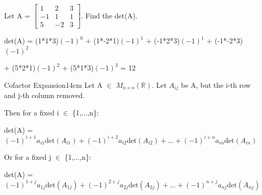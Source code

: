     \vspace{0.5cm}



    \begin{example}
        Let A =
        $
        \begin{bmatrix}
            1 & 2 & 3 \\
            -1 & 1 & 1 \\
            5 & -2 & 3 
        \end{bmatrix}
        $.
        Find the det(A).
    \end{example}

    \begin{tbox}
        det(A) =
        (1*1*3)$(-1)^0$
        + (1*-2*1)$(-1)^1$
        + (-1*2*3)$(-1)^1$
        + (-1*-2*3)$(-1)^2$

        \hspace{1.7cm}
        + (5*2*1)$(-1)^2$
        + (5*1*3)$(-1)^3$
        = 12
    \end{tbox}

    \newpage



    \begin{wtheorem}{Cofactor Expansion}{14cm}
        Let A $\in$ $M_{n \times n}(\mathbb{R})$.
        Let $A_{ij}$ be A, but the i-th row and j-th column removed.

        Then for a fixed i $\in$ \{1,...,n\}:

        \hspace{0.5cm}
        det(A) = $(-1)^{i+1}a_{i1}\text{det}(A_{i1})
                    + (-1)^{i+2}a_{i2}\text{det}(A_{i2})
                    + ... + (-1)^{i+n}a_{in}\text{det}(A_{in})$

        Or for a fixed j $\in$ \{1,...,n\}:

        \hspace{0.5cm}
        det(A) = $(-1)^{1+j}a_{1j}\text{det}(A_{1j})
                    + (-1)^{2+j}a_{2j}\text{det}(A_{2j})
                    + ... + (-1)^{n+j}a_{nj}\text{det}(A_{nj})$
    \end{wtheorem}

